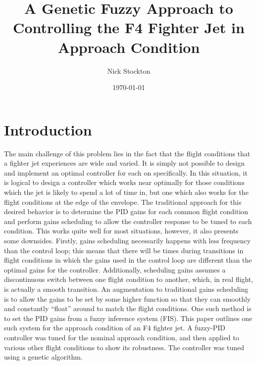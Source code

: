 \documentclass[12pt]{article}
\author{Nick Stockton}
\title{A Genetic Fuzzy Approach to Controlling the F4 Fighter Jet in Approach Condition}
\date{\today}
\begin{document}
\maketitle
\section{Introduction}
The main challenge of this problem lies in the fact that the flight conditions that a fighter jet experiences are wide and varied. It is simply not possible to design and implement an optimal controller for each on specifically. In this situation, it is logical to design a controller which works near optimally for those conditions which the jet is likely to spend a lot of time in, but one which also works for the flight conditions at the edge of the envelope. The traditional approach for this desired behavior is to determine the PID gains for each common flight condition and perform gains scheduling to allow the controller response to be tuned to each condition. This works quite well for most situations, however, it also presents some downsides. Firstly, gains scheduling necessarily happens with less frequency than the control loop; this means that there will be times during transitions in flight conditions in which the gains used in the control loop are different than the optimal gains for the controller. Additionally, scheduling gains assumes a discontinuous switch between one flight condition to another, which, in real flight, is actually a smooth transition. An augmentation to traditional gains scheduling is to allow the gains to be set by some higher function so that they can smoothly and constantly ``float'' around to match the flight conditions. One such method is to set the PID gains from a fuzzy inference system (FIS). This paper outlines one such system for the approach condition of an F4 fighter jet. A fuzzy-PID controller was tuned for the nominal approach condition, and then applied to various other flight conditions to show its robustness. The controller was tuned using a genetic algorithm.
\end{document}
